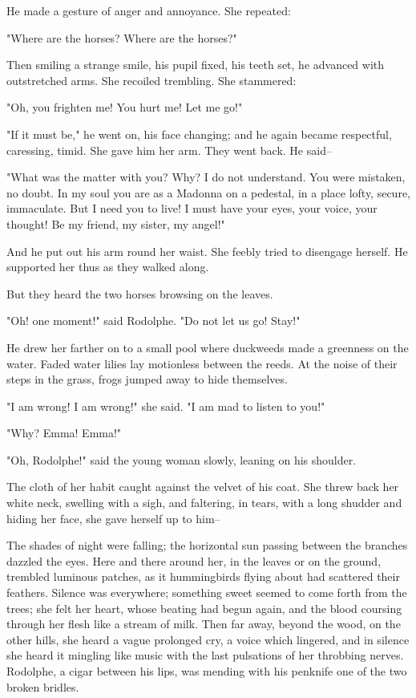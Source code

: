 \documentclass[11pt,twocolumn]{ltugboat}
\begin{document}
He made a gesture of anger and annoyance. She repeated:

"Where are the horses? Where are the horses?"

Then smiling a strange smile, his pupil fixed, his teeth set, he
advanced with outstretched arms. She recoiled trembling. She stammered:

"Oh, you frighten me! You hurt me! Let me go!"

"If it must be," he went on, his face changing; and he again became
respectful, caressing, timid. She gave him her arm. They went back. He
said--

"What was the matter with you? Why? I do not understand. You were
mistaken, no doubt. In my soul you are as a Madonna on a pedestal, in
a place lofty, secure, immaculate. But I need you to live! I must have
your eyes, your voice, your thought! Be my friend, my sister, my angel!"

And he put out his arm round her waist. She feebly tried to disengage
herself. He supported her thus as they walked along.

But they heard the two horses browsing on the leaves.

"Oh! one moment!" said Rodolphe. "Do not let us go! Stay!"

He drew her farther on to a small pool where duckweeds made a greenness
on the water. Faded water lilies lay motionless between the reeds.
At the noise of their steps in the grass, frogs jumped away to hide
themselves.

"I am wrong! I am wrong!" she said. "I am mad to listen to you!"

"Why? Emma! Emma!"

"Oh, Rodolphe!" said the young woman slowly, leaning on his shoulder.

The cloth of her habit caught against the velvet of his coat. She threw
back her white neck, swelling with a sigh, and faltering, in tears, with
a long shudder and hiding her face, she gave herself up to him--

The shades of night were falling; the horizontal sun passing between the
branches dazzled the eyes. Here and there around her, in the leaves
or on the ground, trembled luminous patches, as it hummingbirds flying
about had scattered their feathers. Silence was everywhere; something
sweet seemed to come forth from the trees; she felt her heart, whose
beating had begun again, and the blood coursing through her flesh like a
stream of milk. Then far away, beyond the wood, on the other hills, she
heard a vague prolonged cry, a voice which lingered, and in silence she
heard it mingling like music with the last pulsations of her throbbing
nerves. Rodolphe, a cigar between his lips, was mending with his
penknife one of the two broken bridles.
\end{document}
